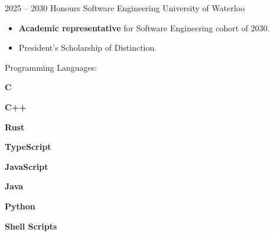 \documentclass[9pt]{developercv} %
\begin{document}
\vspace{0.5cm}


\begin{entrylist}
    \entry
        {2025 -- 2030}
        {Honours Software Engineering}
        {University of Waterloo}
        {
          \vspace*{-\baselineskip}
          \begin{itemize}
            \item \textbf{Academic representative} for Software Engineering cohort of 2030.
            \vspace*{-\baselineskip}
            \medskip
            \item President's Scholarship of Distinction.
          \end{itemize}
        }
\end{entrylist}

%


Programming Languages:
\begin{itemize*}
  \item[] \textbf{C}
  \item \textbf{C++}
  \item \textbf{Rust}
  \item \textbf{TypeScript}
  \item \textbf{JavaScript}
  \item \textbf{Java}
  \item \textbf{Python}
  \item \textbf{Shell Scripts}
\end{itemize*}
\end{document}
